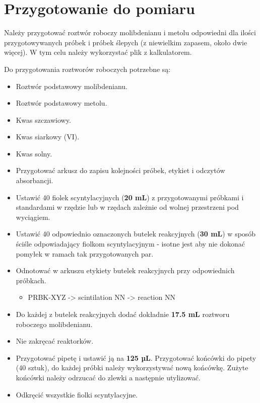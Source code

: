 \documentclass[
  letterpaper,
  DIV=11,
  numbers=noendperiod]{scrreprt}
\providecommand{\tightlist}{%
  \setlength{\itemsep}{0pt}\setlength{\parskip}{0pt}}\usepackage{longtable,booktabs,array}
\begin{document}
\hypertarget{przygotowanie-do-pomiaru}{%
\section{Przygotowanie do pomiaru}\label{przygotowanie-do-pomiaru}}

Należy przygotować roztwór roboczy molibdenianu i metolu odpowiedni dla
ilości przygotowywanych próbek i próbek ślepych (z niewielkim zapasem,
około dwie więcej). W tym celu należy wykorzystać plik z kalkulatorem.

Do przygotowania roztworów roboczych potrzebne są:

\begin{itemize}
\tightlist
\item
  Roztwór podstawowy molibdenianu.
\item
  Roztwór podstawowy metolu.
\item
  Kwas szczawiowy.
\item
  Kwas siarkowy (VI).
\item
  Kwas solny.
\item
  Przygotować arkusz do zapisu kolejności próbek, etykiet i odczytów
  absorbancji.
\item
  Ustawić 40 fiolek scyntylacyjnych (\textbf{20 mL}) z przygotowanymi
  próbkami i standardami w rzędzie lub w rzędach zależnie od wolnej
  przestrzeni pod wyciągiem.
\item
  Ustawić 40 odpowiednio oznaczonych butelek reakcyjnych (\textbf{30
  mL}) w sposób ściśle odpowiadający fiolkom scyntylacyjnym - isotne
  jest aby nie dokonać pomyłek w ramach tak przygotowanych par.
\item
  Odnotować w arkuszu etykiety butelek reakcyjnych przy odpowiednich
  próbkach.

  \begin{itemize}
  \tightlist
  \item
    PRBK-XYZ -\textgreater{} scintilation NN -\textgreater{} reaction NN
  \end{itemize}
\item
  Do każdej z butelek reakcyjnych dodać dokładnie \textbf{17.5 mL}
  roztworu roboczego molibdenianu.
\item
  Nie zakręcać reaktorków.
\item
  Przygotować pipetę i ustawić ją na \textbf{125 µL}. Przygotować
  końcówki do pipety (40 sztuk), do każdej próbki należy wykorzystywać
  nową końcówkę. Zużyte końcówki należy odrzucać do zlewki a następnie
  utylizować.
\item
  Odkręcić wszystkie fiolki scyntylacyjne.
\end{itemize}
\end{document}
